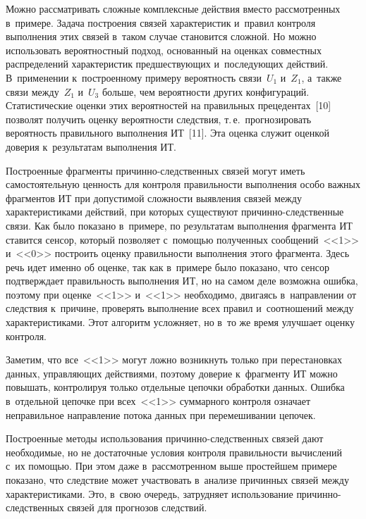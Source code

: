 \begin{multicols}{2}
  Можно рассматривать сложные комплексные действия вместо рассмотренных 
  в~примере. Задача построения связей характеристик и~правил контроля выполнения 
этих связей в~таком случае становится сложной. Но можно использовать 
вероятностный подход, основанный на оценках совместных распределений 
характеристик пред\-шест\-ву\-ющих и~по\-сле\-ду\-ющих действий. В~применении 
к~построенному примеру вероятность связи~$U_1$ и~$Z_1$, а~также связи 
между~$Z_1$ и~$U_3$ больше, чем вероятности других конфигураций. 
Статистические оценки этих вероятностей на правильных прецедентах~[10] 
позволят получить оценку вероятности следствия, т.\,е.\ прогнозировать 
вероятность правильного выполнения ИТ~[11]. Эта оценка служит оценкой 
доверия к~результатам выполнения ИТ.
  
  Построенные фрагменты при\-чин\-но-след\-ст\-вен\-ных связей могут иметь 
самостоятельную ценность для контроля правильности выполнения особо важных 
фрагментов ИТ при допустимой сложности выявления связей между 
характеристиками действий, при которых существуют  
при\-чин\-но-след\-ст\-вен\-ные связи. Как было показано в~примере, по 
результатам выполнения фрагмента ИТ ставится сенсор, который позволяет 
с~помощью полученных сообщений~<<1>> и~<<0>> построить оценку 
правильности выполнения этого фрагмента. Здесь речь идет именно об оценке, 
так как в~примере было показано, что сенсор подтверждает правильность 
выполнения ИТ, но на самом деле возможна ошибка, поэтому при оценке~<<1>> 
и~<<1>> необходимо, двигаясь в~направлении от следствия к~причине, проверять 
выполнение всех правил и~соотношений между характеристиками. Этот алгоритм 
усложняет, но в~то же время улучшает оценку контроля. 
  
  Заметим, что все~<<1>> могут ложно возникнуть только при перестановках 
данных, управ\-ля\-ющих действиями, поэтому доверие к~фрагменту ИТ можно 
повышать, контролируя только отдельные цепочки обработки данных. Ошибка 
в~отдельной цепочке при всех~<<1>> суммарного контроля означает 
неправильное направление потока данных при перемешивании цепочек.
  
  Построенные методы использования при\-чин\-но-след\-ст\-вен\-ных связей 
дают необходимые, но не достаточные условия контроля правильности 
вычислений с~их по\-мощью. При этом даже в~рас\-смот\-рен\-ном выше простейшем 
примере показано, что следствие может участвовать в~анализе причинных связей 
между характеристиками. Это, в~свою очередь, затрудняет использование  
при\-чин\-но-след\-ст\-вен\-ных связей для прогнозов следствий.
  

\end{multicols}
